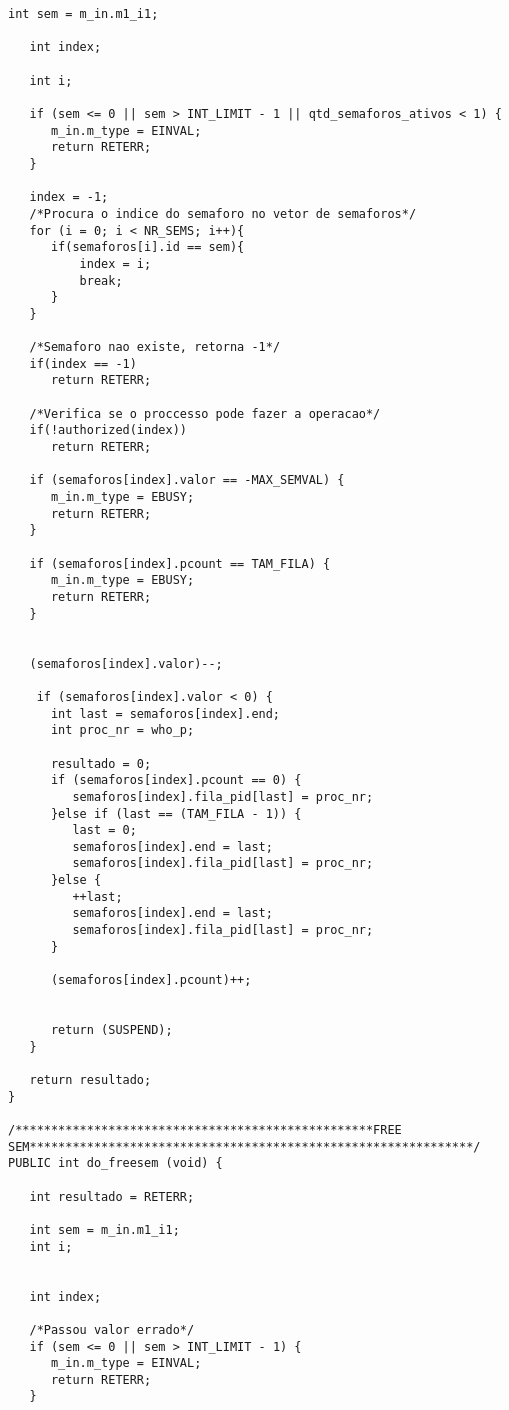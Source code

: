 \documentclass[brazil, a4paper]{scrartcl}
\begin{document}
\begin{lstlisting}[style=customc]
   int sem = m_in.m1_i1;

   int index;
    
   int i;
    
   if (sem <= 0 || sem > INT_LIMIT - 1 || qtd_semaforos_ativos < 1) {
      m_in.m_type = EINVAL;
      return RETERR;
   }
   
   index = -1;
   /*Procura o indice do semaforo no vetor de semaforos*/
   for (i = 0; i < NR_SEMS; i++){
      if(semaforos[i].id == sem){
          index = i;
          break;
      }
   }
   
   /*Semaforo nao existe, retorna -1*/
   if(index == -1)
      return RETERR;    

   /*Verifica se o proccesso pode fazer a operacao*/
   if(!authorized(index))
      return RETERR;
    
   if (semaforos[index].valor == -MAX_SEMVAL) {
      m_in.m_type = EBUSY;
      return RETERR;
   }
    
   if (semaforos[index].pcount == TAM_FILA) {
      m_in.m_type = EBUSY;
      return RETERR;
   }
   
    
   (semaforos[index].valor)--;
    
    if (semaforos[index].valor < 0) {
      int last = semaforos[index].end;
      int proc_nr = who_p;

      resultado = 0;
      if (semaforos[index].pcount == 0) {
         semaforos[index].fila_pid[last] = proc_nr;
      }else if (last == (TAM_FILA - 1)) {
         last = 0;
         semaforos[index].end = last;
         semaforos[index].fila_pid[last] = proc_nr;
      }else {
         ++last;
         semaforos[index].end = last;
         semaforos[index].fila_pid[last] = proc_nr;
      }
       
      (semaforos[index].pcount)++;  
      
       
      return (SUSPEND);
   }

   return resultado;
}

/**************************************************FREE SEM**************************************************************/
PUBLIC int do_freesem (void) {
    
   int resultado = RETERR;  
    
   int sem = m_in.m1_i1;
   int i;
    
    
   int index;
   
   /*Passou valor errado*/
   if (sem <= 0 || sem > INT_LIMIT - 1) {
      m_in.m_type = EINVAL;
      return RETERR;
   }
   

\end{lstlisting}
\end{document}
